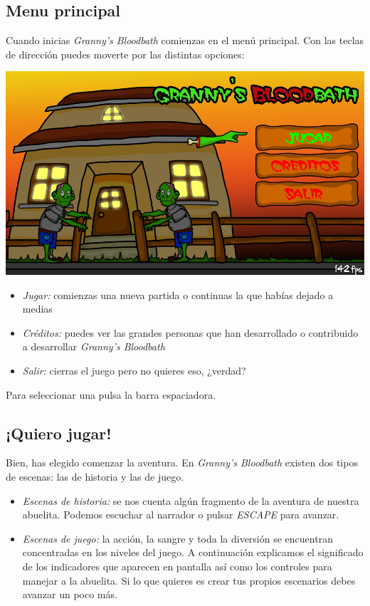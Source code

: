 \subsection{Menu principal}
Cuando inicias \emph{Granny's Bloodbath} comienzas en el menú principal. Con las teclas de dirección puedes moverte por las distintas opciones:

\begin{center}
	\includegraphics[scale=0.35]{screen-menu.png}
\end{center}

\begin{itemize}
	\item \emph{Jugar:} comienzas una nueva partida o continuas la que habías dejado a medias
	\item \emph{Créditos:} puedes ver las grandes personas que han desarrollado o contribuido a desarrollar \emph{Granny's Bloodbath}
	\item \emph{Salir:} cierras el juego pero no quieres eso, ¿verdad?
\end{itemize}

Para seleccionar una pulsa la barra espaciadora.

\subsection{¡Quiero jugar!}
Bien, has elegido comenzar la aventura. En \emph{Granny's Bloodbath} existen dos tipos de escenas: las de historia y las de juego. 

\begin{itemize}
	\item \emph{Escenas de historia: } se nos cuenta algún fragmento de la aventura de nuestra abuelita. Podemos escuchar al narrador o pulsar \emph{ESCAPE} para avanzar.
	\item \emph{Escenas de juego: } la acción, la sangre y toda la diversión se encuentran concentradas en los niveles del juego. A continuación explicamos el significado de los indicadores que aparecen en pantalla así como los controles para manejar a la abuelita. Si lo que quieres es crear tus propios escenarios debes avanzar un poco más.
\end{itemize}


